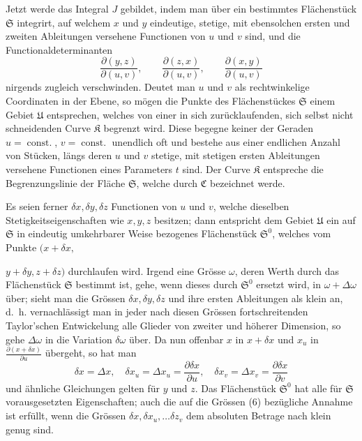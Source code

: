 \documentclass[11pt,a4paper,leqno]{article}
\begin{document}
Jetzt werde das Integral $J$ gebildet, indem man über ein
bestimmtes Flächenstück $\mathfrak{S}$ integrirt, auf welchem $x$ und $y$ eindeutige,
stetige, mit ebensolchen ersten und zweiten Ableitungen versehene
Functionen von $u$ und $v$ sind, und die Functionaldeterminanten
\begin{equation}\tag{6}
\frac{\partial(y,z)}{\partial(u,v)},\qquad
\frac{\partial(z,x)}{\partial(u,v)},\qquad
\frac{\partial(x,y)}{\partial(u,v)}
\end{equation}
nirgends zugleich verschwinden. Deutet man $u$ und $v$ als rechtwinkelige
Coordinaten in der Ebene, so mögen die Punkte des
Flächenstückes $\mathfrak{S}$ einem Gebiet $\mathfrak{U}$ entsprechen, welches von einer
in sich zurücklaufenden, sich selbst nicht schneidenden Curve $\mathfrak{K}$
begrenzt wird. Diese begegne keiner der Geraden $u=\operatorname{const.}$,
$v=\operatorname{const.}$ unendlich oft und bestehe aus einer endlichen Anzahl
von Stücken, längs deren $u$ und $v$ stetige, mit stetigen ersten Ableitungen
versehene Functionen eines Parameters $t$ sind. Der
Curve $\mathfrak{K}$ entspreche die Begrenzungslinie der Fläche $\mathfrak{S}$, welche
durch $\mathfrak{C}$ bezeichnet werde.

Es seien ferner $\delta x,\delta y,\delta z$ Functionen von $u$ und $v$, welche
dieselben Stetigkeitseigenschaften wie $x,y,z$ besitzen; dann entspricht
dem Gebiet $\mathfrak{U}$ ein auf $\mathfrak{S}$ in eindeutig umkehrbarer Weise
bezogenes Flächenstück $\mathfrak{S}^0$, welches vom Punkte $(x+\delta x,$

$y+\delta y,z+\delta z)$ durchlaufen wird. Irgend eine Grösse $\omega$, deren
Werth durch das Flächenstück $\mathfrak{S}$ bestimmt ist, gehe, wenn dieses
durch $\mathfrak{S}^0$ ersetzt wird, in $\omega+\Delta\omega$ über; sieht man die Grössen
$\delta x,\delta y,\delta z$ und ihre ersten Ableitungen als klein an, d.~h. vernachlässigt
man in jeder nach diesen Grössen fortschreitenden
Taylor'schen Entwickelung alle Glieder von zweiter und höherer
Dimension, so gehe $\Delta\omega$ in die Variation $\delta\omega$ über. Da nun
offenbar $x$ in $x+\delta x$ und $x_u$ in $\frac{\partial(x+\delta x)}{\partial u}$ übergeht, so hat
man
\[
\delta x=\Delta x,\quad
\delta x_u=\Delta x_u=\frac{\partial\delta x}{\partial u},\quad
\delta x_v=\Delta x_v=\frac{\partial\delta x}{\partial v}
\]
und ähnliche Gleichungen gelten für $y$ und $z$. Das Flächenstück
$\mathfrak{S}^0$ hat alle für $\mathfrak{S}$ vorausgesetzten Eigenschaften; auch die auf
die Grössen (6) bezügliche Annahme ist erfüllt, wenn die Grössen
$\delta x,\delta x_u,\ldots\delta z_v$ dem absoluten Betrage nach klein genug sind.
\end{document}
